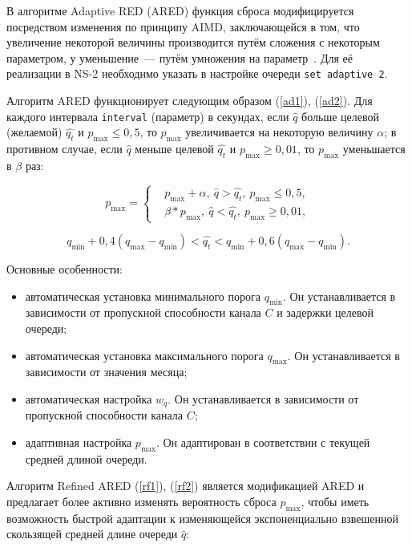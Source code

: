 В алгоритме Adaptive RED (ARED) функция сброса модифицируется
посредством изменения по принципу AIMD, заключающейся в том, что
увеличение некоторой величины производится путём сложения с некоторым
параметром, у уменьшение~--- путём умножения на
параметр~\cite{RARED}. Для её реализации в NS-2 необходимо указать в
настройке очереди \verb|set adaptive 2|.

Алгоритм ARED функционирует следующим образом (\ref{ad1}),
(\ref{ad2}). Для каждого интервала \verb|interval| (параметр) в
секундах, если $\hat{q}$ больше целевой (желаемой) $\hat{q_t}$ и
$p_{\max} \leqslant 0,5$, то $p_{\max}$ увеличивается на некоторую
величину $\alpha$; в противном случае, если $\hat{q}$ меньше целевой
$\hat{q_t}$ и $p_{\max}\geqslant 0,01$, то $p_{\max}$ уменьшается в
$\beta$ раз:

\begin{equation}
\label{ad1}
p_{\max} = \left\{
  \begin{aligned}
    & p_{\max}+\alpha, \ \hat{q}>\hat{q_{t}}, \ p_{\max} \leqslant 0,5, \\
    & \beta * p_{\max}, \ \hat{q}<\hat{q_{t}}, \ p_{\max} \geqslant 0,01, 
  \end{aligned}
\right.
\end{equation}

\begin{equation}
\label{ad2}
q_{\min}+0,4(q_{\max}-q_{\min}) < \hat{q_t} < q_{\min}+0,6\left(q_{\max}-q_{\min}\right).
\end{equation}

Основные особенности: 
\begin{itemize}
\item автоматическая установка минимального порога $q_{\min}$. Он
  устанавливается в зависимости от пропускной способности канала $C$ и
  задержки целевой очереди;
\item автоматическая установка максимального порога $q_{\max}$. Он
  устанавливается в зависимости от значения месяца;
\item автоматическая настройка $w_{q}$. Он устанавливается в
  зависимости от пропускной способности канала $C$;
\item адаптивная настройка $p_{\max}$. Он адаптирован в соответствии с
  текущей средней длиной очереди.
\end{itemize}

Алгоритм Refined ARED (\ref{rf1}), (\ref{rf2}) является модификацией
ARED и предлагает более активно изменять вероятность сброса $p_{\max}$,
чтобы иметь возможность быстрой адаптации к изменяющейся
экспоненциально взвешенной скользящей средней длине очереди $\hat{q}$:

